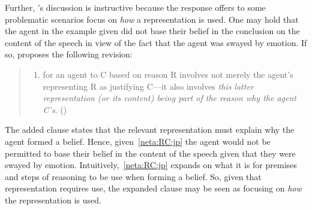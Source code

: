 \begin{note}[Representationalism]
  Further, \citeauthor{Neta:2019aa}'s discussion is instructive because the response \citeauthor{Neta:2019aa} offers to some problematic scenarios focus on \emph{how} a representation is used.
  One may hold that the agent in the example given did not base their belief in the conclusion on the content of the speech in view of the fact that the agent was swayed by emotion.
  If so, \citeauthor{Neta:2019aa} proposes the following revision:
  \begin{quote}
    \begin{enumerate}[label=(R\arabic*\('\)), ref=(R\arabic*\('\))]
    \item\label{neta:RC:jp} for an agent to C based on reason R involves not merely the agent's representing R as justifying C---it also involves \emph{this latter representation (or its content) being part of the reason why the agent C's}.\nolinebreak
      \mbox{}\hfill\mbox{(\Citeyear[197]{Neta:2019aa})}
    \end{enumerate}
  \end{quote}
  The added clause states that the relevant representation must explain why the agent formed a belief.
  Hence, given~\ref{neta:RC:jp} the agent would not be permitted to base their belief in the content of the speech given that they were swayed by emotion.
  Intuitively,~\ref{neta:RC:jp} expands on what it is for premises and steps of reasoning to be use when forming a belief.
  So, given that representation requires use, the expanded clause may be seen as focusing on \emph{how} the representation is used.
\end{note}

